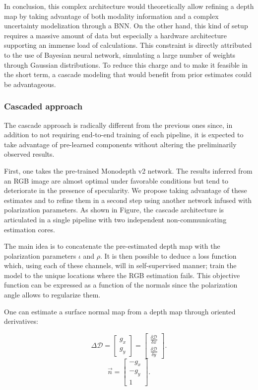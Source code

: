 In conclusion, this complex architecture would theoretically allow refining a depth map by taking advantage of both modality information and a complex uncertainty modelization through a BNN. On the other hand, this kind of setup requires a massive amount of data but especially a hardware architecture supporting an immense load of calculations. This constraint is directly attributed to the use of Bayesian neural network, simulating a large number of weights through Gaussian distributions.
To reduce this charge and to make it feasible in the short term, a cascade modeling that would benefit from prior estimates could be advantageous.

\subsubsection{Cascaded approach}\label{casc}

The cascade approach is radically different from the previous ones since, in addition to not requiring end-to-end training of each pipeline, it is expected to take advantage of pre-learned components without altering the preliminarily observed results.

First, one takes the pre-trained Monodepth v2 network. The results inferred from an RGB image are almost optimal under favorable conditions but tend to deteriorate in the presence of specularity. 
We propose taking advantage of these estimates and to refine them in a second step using another network infused with polarization parameters.
As shown in Figure, the cascade architecture is articulated in a single pipeline with two independent non-communicating estimation cores.



The main idea is to concatenate the pre-estimated depth map with the polarization parameters $\iota$ and $\rho$. It is then possible to deduce a loss function which, using each of these channels, will in self-supervised manner; train the model to the unique locations where the RGB estimation fails.
This objective function can be expressed as a function of the normals since the polarization angle allows to regularize them.

One can estimate a surface normal map from a depth map through oriented derivatives:

\begin{equation}\label{normes}
	\Delta \mathcal{D} = 
	\begin{bmatrix}
	g_x \\ g_y
	\end{bmatrix} =
	\begin{bmatrix}
	\frac{\delta \mathcal{D}}{\delta x} \\ 	\frac{\delta \mathcal{D}}{\delta y}
	\end{bmatrix}.
\end{equation}
\begin{equation}\label{normes2}
	\vec{n} = \begin{bmatrix}
	-g_x\\-g_y\\1
	\end{bmatrix}.
\end{equation}

